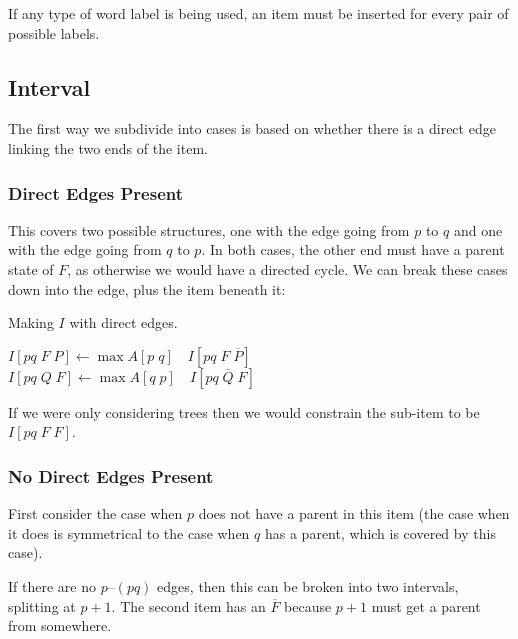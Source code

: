 
\noindent
If any type of word label is being used, an item must be inserted for every pair of possible labels.

\subsection{Interval}
The first way we subdivide into cases is based on whether there is a direct edge linking the two ends of the item.

\subsubsection{Direct Edges Present}

\begin{center}
\end{center}

This covers two possible structures, one with the edge going from $p$ to $q$ and one with the edge going from $q$ to $p$.
In both cases, the other end must have a parent state of $F$, as otherwise we would have a directed cycle.
We can break these cases down into the edge, plus the item beneath it:

\begin{finalEquation}
\caption{Making $I$ with direct edges.}
  $I[pq \; F \; P] \leftarrow \max A[p \; q] \quad I[pq \; F \; \overline{P}]$ \\
  $I[pq \; Q \; F] \leftarrow \max A[q \; p] \quad I[pq \; \overline{Q} \; F]$
\end{finalEquation}

If we were only considering trees then we would constrain the sub-item to be $I[pq \; F \; F]$.

\subsubsection{No Direct Edges Present}

First consider the case when $p$ does not have a parent in this item (the case when it does is symmetrical to the case when $q$ has a parent, which is covered by this case).

If there are no $p$--$(pq)$ edges, then this can be broken into two intervals, splitting at $p+1$.
The second item has an $\overline{F}$ because $p+1$ must get a parent from somewhere.

